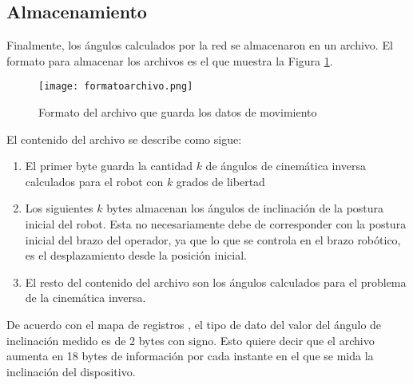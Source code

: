 \subsection{Almacenamiento}

Finalmente, los ángulos calculados por la red se almacenaron en un archivo. El formato para almacenar los archivos es el que muestra la Figura \ref{fig:formatoarchivo}.

\begin{figure}[htb]
	\centering
	\texttt{[image: formatoarchivo.png]}
	\caption{Formato del archivo que guarda los datos de movimiento}
	\label{fig:formatoarchivo}
\end{figure}

El contenido del archivo se describe como sigue:

\begin{enumerate}
	\item El primer byte guarda la cantidad $k$ de ángulos de cinemática inversa calculados para el robot con $k$ grados de libertad
	\item Los siguientes $k$ bytes almacenan los ángulos de inclinación de la postura inicial del robot. Esta no necesariamente debe de corresponder con la postura inicial del brazo del operador, ya que lo que se controla en el brazo robótico, es el desplazamiento desde la posición inicial.
	\item El resto del contenido del archivo son los ángulos calculados para el problema de la cinemática inversa.
\end{enumerate}

De acuerdo con el mapa de registros \cite{registermap}, el tipo de dato del valor del ángulo de inclinación medido es de 2 bytes con signo. Esto quiere decir que el archivo aumenta en 18 bytes de información por cada instante en el que se mida la inclinación del dispositivo.